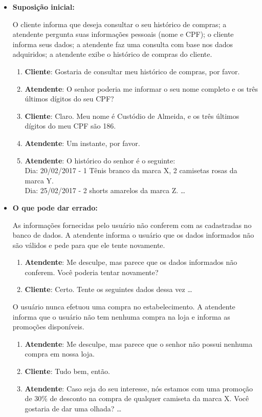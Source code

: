 \begin{itemize}
    \item \textbf{Suposição inicial:}
    
    O cliente informa que deseja consultar o seu histórico de compras; a atendente pergunta suas informações pessoais (nome e CPF); o cliente informa seus dados; a atendente faz uma consulta com base nos dados adquiridos; a atendente exibe o histórico de compras do cliente.
    
    \begin{enumerate}
        \item \textbf{Cliente}: Gostaria de consultar meu histórico de compras, por favor.
        \item \textbf{Atendente}: O senhor poderia me informar o seu nome completo e os três últimos dígitos do seu CPF?
        \item \textbf{Cliente}: Claro. Meu nome é Custódio de Almeida, e os três últimos dígitos do meu CPF são 186.
        \item \textbf{Atendente}: Um instante, por favor.
        \item \textbf{Atendente}: O histórico do senhor é o seguinte: \\
        Dia: 20/02/2017 - 1 Tênis branco da marca X, 2 camisetas rosas da marca Y.\\
        Dia: 25/02/2017 - 2 shorts amarelos da marca Z.
        \ldots
    \end{enumerate}
    
    \item \textbf{O que pode dar errado:}
    
    As informações fornecidas pelo usuário não conferem com as cadastradas no banco de dados. A atendente informa o usuário que os dados informados não são válidos e pede para que ele tente novamente.
    
    \begin{enumerate}
        \item \textbf{Atendente}: Me desculpe, mas parece que os dados informados não conferem. Você poderia tentar novamente?
        \item \textbf{Cliente}: Certo. Tente os seguintes dados dessa vez \ldots
    \end{enumerate}
    
    O usuário nunca efetuou uma compra no estabelecimento. A atendente informa que o usuário não tem nenhuma compra na loja e informa as promoções disponíveis.
    
    \begin{enumerate}
        \item \textbf{Atendente}: Me desculpe, mas parece que o senhor não possui nenhuma compra em nossa loja.
        \item \textbf{Cliente}: Tudo bem, então.
        \item \textbf{Atendente}: Caso seja do seu interesse, nós estamos com uma promoção de 30\% de desconto na compra de qualquer camiseta da marca X. Você gostaria de dar uma olhada? \ldots
    \end{enumerate}
    

\end{itemize}

